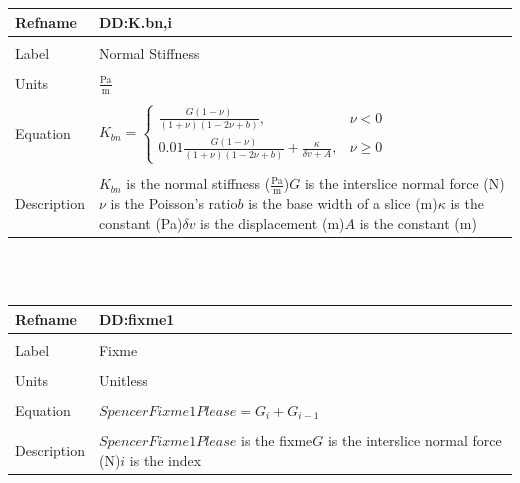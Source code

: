 \documentclass[12pt]{article}
\begin{document}
\noindent \begin{minipage}{\textwidth}
\begin{tabular}{p{} p{}}
\toprule \textbf{Refname} & \textbf{DD:K.bn,i}
\label{DD:K.bn,i}
\\ \midrule \\
Label & Normal Stiffness
\\ \midrule \\
Units & $\frac{\text{Pa}}{\text{m}}$
\\ \midrule \\
Equation & ${K_{bn}}=\begin{cases}
\frac{G \left(1-ν\right)}{\left(1+ν\right) \left(1-2 ν+b\right)}, & ν<0\\
0.01 \frac{G \left(1-ν\right)}{\left(1+ν\right) \left(1-2 ν+b\right)}+\frac{κ}{δv+A}, & ν\geq{}0
\end{cases}$
\\ \midrule \\
Description & ${K_{bn}}$ is the normal stiffness ($\frac{\text{Pa}}{\text{m}}$)\newline$G$ is the interslice normal force (N)\newline$ν$ is the Poisson's ratio\newline$b$ is the base width of a slice (m)\newline$κ$ is the constant (Pa)\newline$δv$ is the displacement (m)\newline$A$ is the constant (m)
\\ \bottomrule \end{tabular}
\end{minipage}\\
~\newline
\noindent \begin{minipage}{\textwidth}
\begin{tabular}{p{} p{}}
\toprule \textbf{Refname} & \textbf{DD:fixme1}
\label{DD:fixme1}
\\ \midrule \\
Label & Fixme
\\ \midrule \\
Units & Unitless
\\ \midrule \\
Equation & $SpencerFixme1Please=G_{i}+G_{i-1}$
\\ \midrule \\
Description & $SpencerFixme1Please$ is the fixme\newline$G$ is the interslice normal force (N)\newline$i$ is the index
\\ \bottomrule \end{tabular}
\end{minipage}\\
\end{document}
